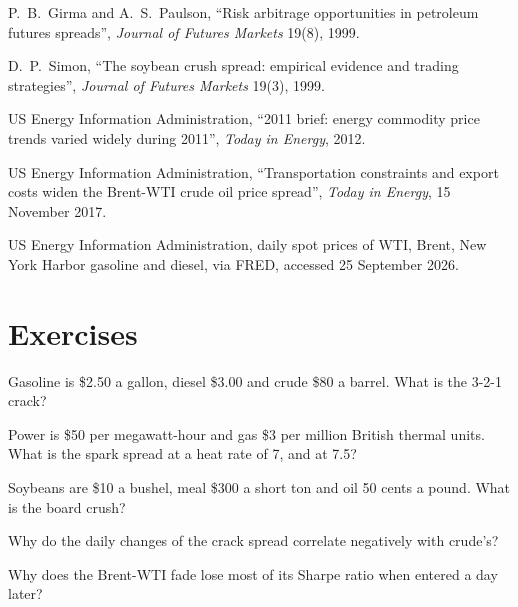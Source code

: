 \begin{omsources}
\item P.~B.~Girma and A.~S.~Paulson, ``Risk arbitrage opportunities in petroleum futures spreads'', \emph{Journal of Futures Markets} 19(8), 1999.
\item D.~P.~Simon, ``The soybean crush spread: empirical evidence and trading strategies'', \emph{Journal of Futures Markets} 19(3), 1999.
\item US Energy Information Administration, ``2011 brief: energy commodity price trends varied widely during 2011'', \emph{Today in Energy}, 2012.
\item US Energy Information Administration, ``Transportation constraints and export costs widen the Brent-WTI crude oil price spread'',
\emph{Today in Energy}, 15 November 2017.
\item US Energy Information Administration, daily spot prices of WTI, Brent, New York Harbor gasoline and diesel, via FRED, accessed 25 September
2026.
\end{omsources}

\section{Exercises}

\begin{exercise}[$\star$]\label{exo:s2:commodity-spreads:1}
Gasoline is \$2.50 a gallon, diesel \$3.00 and crude \$80 a barrel. What is the 3-2-1 crack?
\end{exercise}

\begin{exercise}[$\star$]\label{exo:s2:commodity-spreads:2}
Power is \$50 per megawatt-hour and gas \$3 per million British thermal units. What is the spark spread at a heat rate of 7, and at 7.5?
\end{exercise}

\begin{exercise}[$\star$]\label{exo:s2:commodity-spreads:3}
Soybeans are \$10 a bushel, meal \$300 a short ton and oil 50 cents a pound. What is the board crush?
\end{exercise}

\begin{exercise}[$\star\star$]\label{exo:s2:commodity-spreads:4}
Why do the daily changes of the crack spread correlate negatively with crude's?
\end{exercise}

\begin{exercise}[$\star\star$]\label{exo:s2:commodity-spreads:5}
Why does the Brent-WTI fade lose most of its Sharpe ratio when entered a day later?
\end{exercise}

